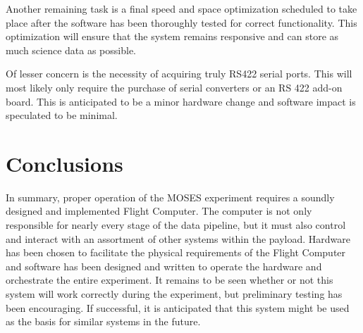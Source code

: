 \documentclass[11pt,titlepage]{article}
\begin{document}
Another remaining task is a final speed and space optimization scheduled to take place after the software has been thoroughly tested for correct 
functionality. This optimization will ensure that the system remains responsive and can store as much science data as possible.

Of lesser concern is the necessity of acquiring truly RS422 serial ports. This will most likely only require the purchase of serial converters or an
RS 422 add-on board. This is anticipated to be a minor hardware change and software impact is speculated to be minimal.


\section{Conclusions}
In summary, proper operation of the MOSES experiment requires a soundly designed and implemented Flight Computer. The computer is not only responsible for
nearly every stage of the data pipeline, but it must also control and interact with an assortment of other systems within the payload. Hardware has been chosen
to facilitate the physical requirements of the Flight Computer and software has been designed and written to operate the hardware and orchestrate the 
entire experiment. It remains to be seen whether or not this system will work correctly during the experiment, but preliminary testing has been encouraging.
If successful, it is anticipated that this system might be used as the basis for similar systems in the future.
\end{document}
